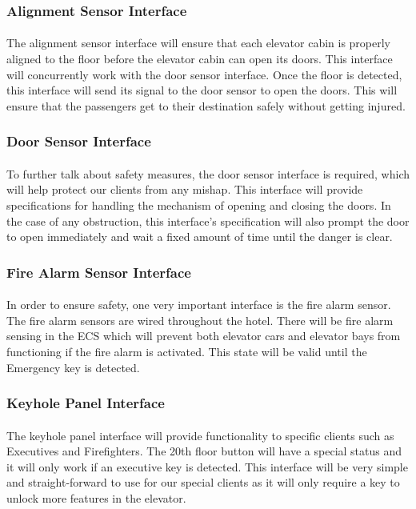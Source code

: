 \documentclass[12pt]{article}
\begin{document}
\subsubsection{Alignment Sensor Interface}
\paragraph{} The alignment sensor interface will ensure that each elevator cabin is properly aligned to the floor before the elevator cabin can open its doors. This interface will concurrently work with the door sensor interface. Once the floor is detected, this interface will send its signal to the door sensor to open the doors. This will ensure that the passengers get to their destination safely without getting injured.
\subsubsection{Door Sensor Interface}
\paragraph{}To further talk about safety measures, the door sensor interface is required, which will help protect our clients from any mishap. This interface will provide specifications for handling the mechanism of opening and closing the doors. In the case of any obstruction, this interface’s specification will also prompt the door to open immediately and wait a fixed amount of time until the danger is clear.
\subsubsection{Fire Alarm Sensor Interface}
\paragraph{} In order to ensure safety, one very important interface is the fire alarm sensor. The fire alarm sensors are wired throughout the hotel. There will be fire alarm sensing in the ECS which will prevent both elevator cars and elevator bays from functioning if the fire alarm is activated. This state will be valid until the Emergency key is detected.
\subsubsection{Keyhole Panel Interface}
\paragraph{} The keyhole panel interface will provide functionality to specific clients such as Executives and Firefighters. The 20th floor button will have a special status and it will only work if an executive key is detected. This interface will be very simple and straight-forward to use for our special clients as it will only require a key to unlock more features in the elevator.
\end{document}
